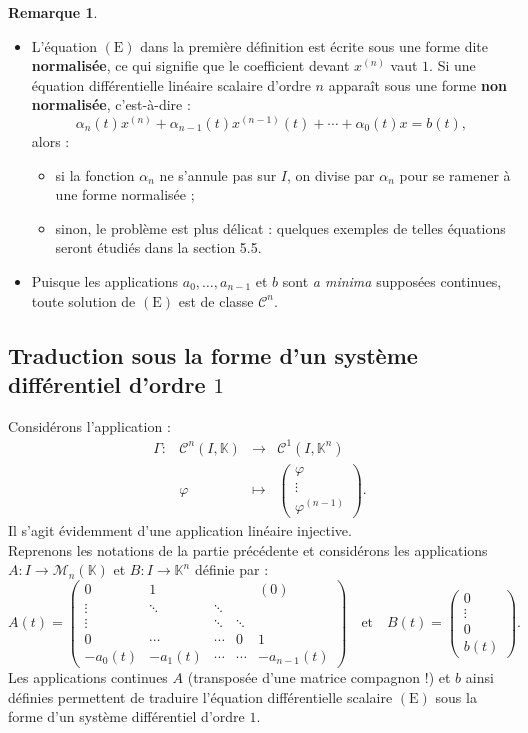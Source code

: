\documentclass[french]{article}
\newcommand{\K}{\mathbb{K}}
\theoremstyle{plain}
\theoremstyle{definition}
\newtheorem*{rmq}{Remarque}
\theoremstyle{remark}
\begin{document}
\begin{rmq}
	\begin{itemize}
		\item L'équation $(\text{E})$ dans la première définition est écrite sous une forme dite \textbf{normalisée}, ce qui signifie que le coefficient devant $x^{(n)}$ vaut $1$. Si une équation différentielle linéaire scalaire d'ordre $n$ apparaît sous une forme \textbf{non normalisée}, c'est-à-dire :
		$$\alpha_n(t)x^{(n)}+\alpha_{n-1}(t)x^{(n-1)}(t)+\cdots+\alpha_0(t)x=b(t),$$
		alors :
		\begin{itemize}[label=$\star$]
			\item si la fonction $\alpha_n$ ne s'annule pas sur $I$, on divise par $\alpha_n$ pour se ramener à une forme normalisée ;
			\item sinon, le problème est plus délicat : quelques exemples de telles équations seront étudiés dans la section 5.5.
		\end{itemize}
		\item Puisque les applications $a_0,\ldots,a_{n-1}$ et $b$ sont \textit{a minima} supposées continues, toute solution de $(\text{E})$ est de classe $\mathcal{C}^n$.
	\end{itemize}
\end{rmq}

\subsection{Traduction sous la forme d'un système différentiel d'ordre $1$}

Considérons l'application :
$$\begin{array}{lrcl}
	\Gamma:&\mathcal{C}^n(I,\K)&\longrightarrow&\mathcal{C}^1(I,\K^n)\\
	&\varphi&\longmapsto&\displaystyle\begin{pmatrix}
		\varphi\\
		\vdots\\
		\varphi^{(n-1)}
	\end{pmatrix}.
\end{array}$$
Il s'agit évidemment d'une application linéaire injective.\\
Reprenons les notations de la partie précédente et considérons les applications $A:I\to\mathcal{M}_n(\K)$ et $B:I\to\K^n$ définie par :
$$A(t)=\begin{pmatrix}
	0&1&&&(0)\\
	\vdots&\ddots&\ddots&&\\
	\vdots&&\ddots&\ddots&\\
	0&\cdots&\cdots&0&1\\
	-a_0(t)&-a_1(t)&\cdots&\cdots&-a_{n-1}(t)
\end{pmatrix}\quad\text{et}\quad B(t)=\begin{pmatrix}
0\\
\vdots\\
0\\
b(t)
\end{pmatrix}.$$
Les applications continues $A$ (transposée d'une matrice compagnon !) et $b$ ainsi définies permettent de traduire l'équation différentielle scalaire $(\text{E})$ sous la forme d'un système différentiel d'ordre $1$.
\end{document}
